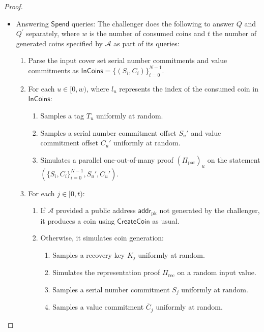 \documentclass{llncs}
\newcommand{\func}[1]{\mathsf{#1}}
\newcommand{\addr}{\func{addr}}
\newcommand{\com}{\func{Com}}
\begin{document}
\begin{proof}
\begin{itemize}
\begin{enumerate}
\begin{enumerate}
        \end{enumerate}
        \item Simulates the balance proof $\Pi_{\text{bal}}$ on the statement $(C - \com(v,0))$.
        \item Assembles the transaction and adds it to the ledger as appropriate.
    \end{enumerate}
    \item Answering $\func{Spend}$ queries: The challenger does the following to answer $Q$ and $Q^\prime$ separately, where $w$ is the number of consumed coins and $t$ the number of generated coins specified by $\mathcal{A}$ as part of its queries:
    \begin{enumerate}
        \item Parse the input cover set serial number commitments and value commitments as $\func{InCoins} = \{(S_i, C_i)\}_{i=0}^{N-1}$.
        \item For each $u \in [0,w)$, where $l_u$ represents the index of the consumed coin in $\func{InCoins}$:
        \begin{enumerate}
            \item Samples a tag $T_u$ uniformly at random.
            \item Samples a serial number commitment offset $S_u'$ and value commitment offset $C_u'$ uniformly at random.
            \item Simulates a parallel one-out-of-many proof $(\Pi_{\text{par}})_u$ on the statement $(\{S_i, C_i\}_{i=0}^{N-1},S_u',C_u')$.
        \end{enumerate}
        \item For each $j \in [0,t)$:
        \begin{enumerate}
            \item If $\mathcal{A}$ provided a public address $\addr_{\text{pk}}$ not generated by the challenger, it produces a coin using $\func{CreateCoin}$ as usual.
            \item Otherwise, it simulates coin generation:
            \begin{enumerate}
                \item Samples a recovery key $K_j$ uniformly at random.
                \item Simulates the representation proof $\Pi_{\text{rec}}$ on a random input value.
                \item Samples a serial number commitment $S_j$ uniformly at random.
                \item Samples a value commitment $\overline{C}_j$ uniformly at random.

\end{enumerate}
\end{enumerate}
\end{enumerate}
\end{itemize}
\end{proof}
\end{document}
